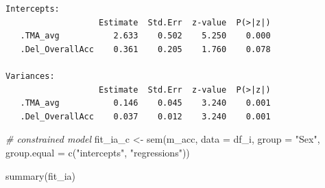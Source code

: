 \documentclass[
  letterpaper,
  DIV=11,
  numbers=noendperiod]{scrartcl}
\newenvironment{Shaded}{\begin{snugshade}}{\end{snugshade}}
\newcommand{\AttributeTok}[1]{\textcolor[rgb]{0.49,0.56,0.16}{#1}}
\newcommand{\CommentTok}[1]{\textcolor[rgb]{0.38,0.63,0.69}{\textit{#1}}}
\newcommand{\FunctionTok}[1]{\textcolor[rgb]{0.02,0.16,0.49}{#1}}
\newcommand{\NormalTok}[1]{\textcolor[rgb]{0.00,0.44,0.13}{#1}}
\newcommand{\OtherTok}[1]{\textcolor[rgb]{0.00,0.44,0.13}{#1}}
\newcommand{\StringTok}[1]{\textcolor[rgb]{0.25,0.44,0.63}{#1}}
\begin{document}
\begin{verbatim}
Intercepts:
                   Estimate  Std.Err  z-value  P(>|z|)
   .TMA_avg           2.633    0.502    5.250    0.000
   .Del_OverallAcc    0.361    0.205    1.760    0.078

Variances:
                   Estimate  Std.Err  z-value  P(>|z|)
   .TMA_avg           0.146    0.045    3.240    0.001
   .Del_OverallAcc    0.037    0.012    3.240    0.001
\end{verbatim}

\begin{Shaded}
\begin{Highlighting}[]
\CommentTok{\# constrained model}
\NormalTok{fit\_ia\_c }\OtherTok{\textless{}{-}} \FunctionTok{sem}\NormalTok{(m\_acc, }\AttributeTok{data =}\NormalTok{ df\_i, }\AttributeTok{group =} \StringTok{"Sex"}\NormalTok{,}
                \AttributeTok{group.equal =} \FunctionTok{c}\NormalTok{(}\StringTok{"intercepts"}\NormalTok{, }\StringTok{"regressions"}\NormalTok{))}
\end{Highlighting}
\end{Shaded}

\begin{Shaded}
\begin{Highlighting}[]
\FunctionTok{summary}\NormalTok{(fit\_ia)}
\end{Highlighting}
\end{Shaded}
\end{document}
